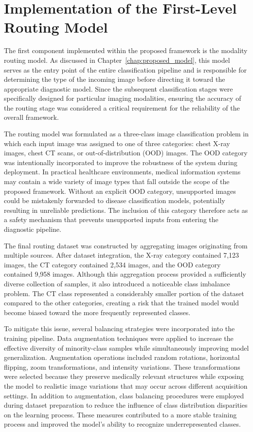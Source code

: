 \section[Routing Model Implementation]{Implementation of the First-Level Routing Model}
\label{sec:routing_model_implementation}

The first component implemented within the proposed framework is the modality routing model. As discussed in Chapter~\ref{chap:proposed_model}, this model serves as the entry point of the entire classification pipeline and is responsible for determining the type of the incoming image before directing it toward the appropriate diagnostic model. Since the subsequent classification stages were specifically designed for particular imaging modalities, ensuring the accuracy of the routing stage was considered a critical requirement for the reliability of the overall framework.

The routing model was formulated as a three-class image classification problem in which each input image was assigned to one of three categories: chest X-ray images, chest CT scans, or out-of-distribution (OOD) images. The OOD category was intentionally incorporated to improve the robustness of the system during deployment. In practical healthcare environments, medical information systems may contain a wide variety of image types that fall outside the scope of the proposed framework. Without an explicit OOD category, unsupported images could be mistakenly forwarded to disease classification models, potentially resulting in unreliable predictions. The inclusion of this category therefore acts as a safety mechanism that prevents unsupported inputs from entering the diagnostic pipeline.

The final routing dataset was constructed by aggregating images originating from multiple sources. After dataset integration, the X-ray category contained 7,123 images, the CT category contained 2,534 images, and the OOD category contained 9,958 images. Although this aggregation process provided a sufficiently diverse collection of samples, it also introduced a noticeable class imbalance problem. The CT class represented a considerably smaller portion of the dataset compared to the other categories, creating a risk that the trained model would become biased toward the more frequently represented classes.

To mitigate this issue, several balancing strategies were incorporated into the training pipeline. Data augmentation techniques were applied to increase the effective diversity of minority-class samples while simultaneously improving model generalization. Augmentation operations included random rotations, horizontal flipping, zoom transformations, and intensity variations. These transformations were selected because they preserve medically relevant structures while exposing the model to realistic image variations that may occur across different acquisition settings. In addition to augmentation, class balancing procedures were employed during dataset preparation to reduce the influence of class distribution disparities on the learning process. These measures contributed to a more stable training process and improved the model's ability to recognize underrepresented classes.


